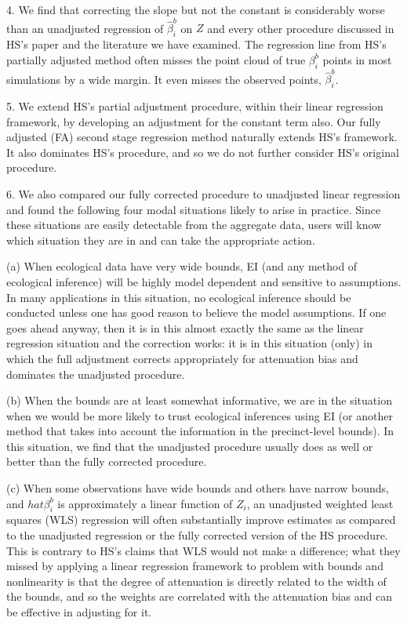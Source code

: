 \documentclass[11pt,titlepage]{article}
\begin{document}
4. We find that correcting the slope but not the constant is
considerably worse than an unadjusted regression of $\hat\beta_i^b$ on
$Z$ and every other procedure discussed in HS's paper and the
literature we have examined.  The regression line from HS's partially
adjusted method often misses the point cloud of true $\beta_i^b$
points in most simulations by a wide margin.  It even misses the
observed points, $\hat\beta_i^b$.

5.  We extend HS's partial adjustment procedure, within their linear
regression framework, by developing an adjustment for the constant
term also.  Our fully adjusted (FA) second stage regression method
naturally extends HS's framework.  It also dominates HS's procedure,
and so we do not further consider HS's original procedure.

6.  We also compared our fully corrected procedure to unadjusted
linear regression and found the following four modal situations likely
to arise in practice. Since these situations are easily detectable
from the aggregate data, users will know which situation they are in
and can take the appropriate action.

(a) When ecological data have very wide bounds, EI (and any method of
ecological inference) will be highly model dependent and sensitive to
assumptions.  In many applications in this situation, no ecological
inference should be conducted unless one has good reason to believe
the model assumptions.  If one goes ahead anyway, then it is in this
almost exactly the same as the linear regression situation and the
correction works: it is in this situation (only) in which the full
adjustment corrects appropriately for attenuation bias and dominates
the unadjusted procedure.

(b) When the bounds are at least somewhat informative, we are in the
situation when we would be more likely to trust ecological inferences
using EI (or another method that takes into account the information in
the precinct-level bounds).  In this situation, we find that the
unadjusted procedure usually does as well or better than the fully
corrected procedure.

(c) When some observations have wide bounds and others have narrow
bounds, and $hat\beta_i^b$ is approximately a linear function of
$Z_i$, an unadjusted weighted least squares (WLS) regression will
often substantially improve estimates as compared to the unadjusted
regression or the fully corrected version of the HS procedure.  This
is contrary to HS's claims that WLS would not make a difference; what
they missed by applying a linear regression framework to problem with
bounds and nonlinearity is that the degree of attenuation is directly
related to the width of the bounds, and so the weights are correlated
with the attenuation bias and can be effective in adjusting for it.
\end{document}
